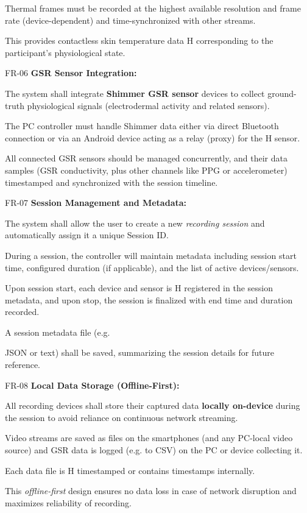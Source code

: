 Thermal frames must be recorded at the highest available resolution and frame
rate (device-dependent) and time-synchronized with other streams.

This provides contactless skin temperature data H corresponding to the
participant's physiological state.

FR-06 \textbf{GSR Sensor Integration:}

The system shall integrate \textbf{Shimmer GSR sensor}
devices to collect ground-truth physiological signals (electrodermal activity
and related sensors).

The PC controller must handle Shimmer data either via direct Bluetooth
connection or via an Android device acting as a relay (proxy) for the H sensor.

All connected GSR sensors should be managed concurrently, and their data samples
(GSR conductivity, plus other channels like PPG or accelerometer) timestamped
and synchronized with the session timeline.

FR-07 \textbf{Session Management and Metadata:}

The system shall allow the user to create a new \textit{recording session} and automatically assign it a unique Session ID.

During a session, the controller will maintain metadata including session start
time, configured duration (if applicable), and the list of active
devices/sensors.

Upon session start, each device and sensor is H registered in the session
metadata, and upon stop, the session is finalized with end time and duration
recorded.

A session metadata file (e.g.

JSON or text) shall be saved, summarizing the session details for future
reference.

FR-08 \textbf{Local Data Storage (Offline-First):}

All recording devices shall store their captured data \textbf{locally on-device}
 during the session to avoid reliance on continuous network streaming.

Video streams are saved as files on the smartphones (and any PC-local video
source) and GSR data is logged (e.g. to CSV) on the PC or device collecting it.

Each data file is H timestamped or contains timestamps internally.

This \textit{offline-first} design ensures no data loss in case of network disruption and maximizes reliability of recording.

